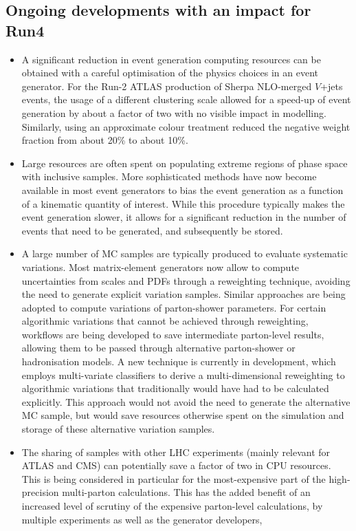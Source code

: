 \subsection{Ongoing developments with an impact for Run4}
\begin{itemize}
\item A significant reduction in event generation computing resources can be obtained with a careful optimisation of the physics choices in an event generator. For the Run-2 ATLAS production of Sherpa NLO-merged $V$+jets events, the usage of a different clustering scale allowed for a  speed-up of event generation by about a factor of two with no visible impact in modelling. Similarly, using an approximate colour treatment  reduced the negative weight fraction from about 20\% to about 10\%.
\item Large resources are often spent on populating extreme regions of phase space with inclusive samples. More sophisticated methods have now become available in most event generators to bias the event generation as a function of a kinematic quantity of interest.
While this procedure typically makes the event generation slower, it allows for a significant reduction in the number of events that need to be generated, and subsequently be stored.
\item  A large number of MC samples are typically produced to evaluate systematic variations. Most matrix-element generators now allow to compute uncertainties from scales and PDFs through a reweighting technique, avoiding the need to generate explicit variation samples. Similar approaches are being adopted to compute variations of parton-shower parameters. For certain algorithmic variations that cannot be achieved through reweighting, workflows are being developed to save intermediate parton-level results, allowing them to be passed through alternative parton-shower or hadronisation models. A new technique is currently in development, which employs multi-variate classifiers to derive a multi-dimensional reweighting to algorithmic variations that traditionally would have had to be calculated explicitly.
This approach would not avoid the need to generate the alternative MC sample, but would save resources otherwise spent on the simulation and storage of these alternative variation samples.
\item The sharing of samples with other LHC experiments (mainly relevant for ATLAS and CMS) can potentially save a factor of two in CPU resources. This is being considered in particular for the most-expensive part of the high-precision multi-parton calculations. This has the added benefit of an increased level of scrutiny of the expensive parton-level calculations, by multiple experiments as well as the generator developers,

\end{itemize}
